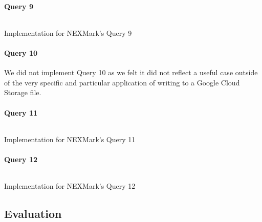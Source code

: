 \paragraph{Query 9}
\begin{listing}[H]
  \inputminted[firstline=701,lastline=737]{rust}{benchmarks/src/nexmark.rs}
  \caption{Implementation for NEXMark's Query 9}
  \label{lst:nexmark-query9}
\end{listing}

\paragraph{Query 10}
We did not implement Query 10 as we felt it did not reflect a useful case outside of the very specific and particular application of writing to a Google Cloud Storage file.

\paragraph{Query 11}
\begin{listing}[H]
  \inputminted[firstline=784,lastline=787]{rust}{benchmarks/src/nexmark.rs}
  \caption{Implementation for NEXMark's Query 11}
  \label{lst:nexmark-query11}
\end{listing}

\paragraph{Query 12}
\begin{listing}[H]
  \inputminted[firstline=811,lastline=818]{rust}{benchmarks/src/nexmark.rs}
  \caption{Implementation for NEXMark's Query 12}
  \label{lst:nexmark-query12}
\end{listing}

\subsection{Evaluation}

